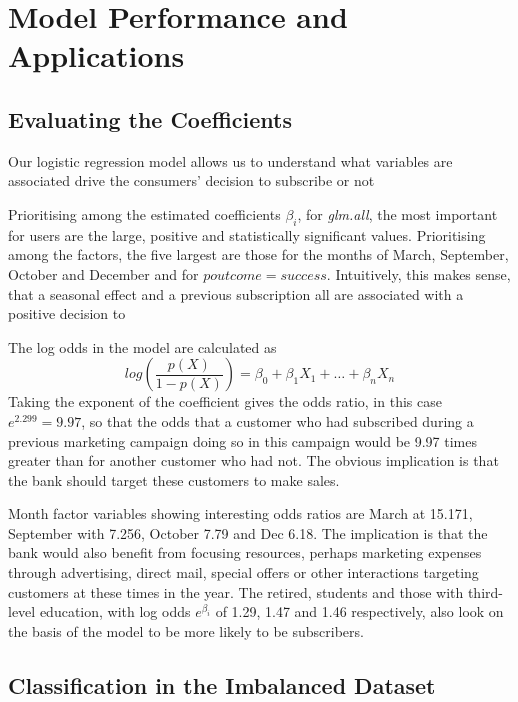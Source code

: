 \documentclass[9pt,technote]{IEEEtran}
\begin{document}
\section{Model Performance and Applications}

\subsection{Evaluating the Coefficients}

Our logistic regression model allows us to understand what variables are associated drive the consumers' decision to subscribe or not 

Prioritising among the estimated coefficients $\beta_i$, for \textit{glm.all}, the most important for users are the large, positive and statistically significant values.  Prioritising among the factors, the five largest are those for the months of March, September, October and December and for $poutcome=success$.  Intuitively, this makes sense, that a seasonal effect and a previous subscription all are associated with a positive decision to  

The log odds in the model are calculated as 
\begin{equation}
log\left(\frac{p(X)}{1-p(X)}\right) = \beta_0 + \beta_1 X_1 + \dots +\beta_n X_n
\end{equation}
Taking the exponent of the coefficient gives the odds ratio, in this case $e^{2.299} = 9.97$, so that the odds that a customer who had subscribed during a previous marketing campaign doing so in this campaign would be 9.97 times greater than for another customer who had not.  The obvious implication is that the bank should target these customers to make sales.  

Month factor variables showing interesting odds ratios are March at 15.171, September with 7.256, October 7.79 and Dec 6.18.  The implication is that the bank would also benefit from focusing resources, perhaps marketing expenses through advertising, direct mail, special offers or other interactions targeting customers at these times in the year.  The retired, students and those with third-level education, with log odds $e^{\beta_i}$ of 1.29, 1.47 and 1.46 respectively, also look on the basis of the model to be more likely to be subscribers.  

\subsection{Classification in the Imbalanced Dataset}
\label{sec:imbalance}
\end{document}
